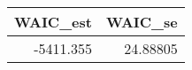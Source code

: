 \begin{longtable}{rr}
\toprule
WAIC\_est & WAIC\_se \\ 
\midrule
-5411.355 & 24.88805 \\ 
\bottomrule
\end{longtable}

